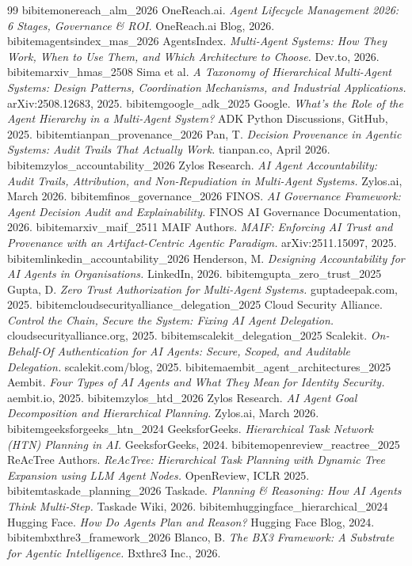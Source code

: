 \begin{thebibliography}{99}
%
%
 bibitem{onereach_alm_2026}
OneReach.ai. \emph{Agent Lifecycle Management 2026: 6 Stages, Governance \& ROI.}
OneReach.ai Blog, 2026.
%
 bibitem{agentsindex_mas_2026}
AgentsIndex. \emph{Multi-Agent Systems: How They Work, When to Use Them, and Which Architecture to Choose.}
Dev.to, 2026.
%
 bibitem{arxiv_hmas_2508}
Sima et al. \emph{A Taxonomy of Hierarchical Multi-Agent Systems: Design Patterns, Coordination Mechanisms, and Industrial Applications.}
arXiv:2508.12683, 2025.
%
 bibitem{google_adk_2025}
Google. \emph{What's the Role of the Agent Hierarchy in a Multi-Agent System?}
ADK Python Discussions, GitHub, 2025.
%
%
 bibitem{tianpan_provenance_2026}
Pan, T. \emph{Decision Provenance in Agentic Systems: Audit Trails That Actually Work.}
tianpan.co, April 2026.
%
 bibitem{zylos_accountability_2026}
Zylos Research. \emph{AI Agent Accountability: Audit Trails, Attribution, and Non-Repudiation in Multi-Agent Systems.}
Zylos.ai, March 2026.
%
 bibitem{finos_governance_2026}
FINOS. \emph{AI Governance Framework: Agent Decision Audit and Explainability.}
FINOS AI Governance Documentation, 2026.
%
 bibitem{arxiv_maif_2511}
MAIF Authors. \emph{MAIF: Enforcing AI Trust and Provenance with an Artifact-Centric Agentic Paradigm.}
arXiv:2511.15097, 2025.
%
 bibitem{linkedin_accountability_2026}
Henderson, M. \emph{Designing Accountability for AI Agents in Organisations.}
LinkedIn, 2026.
%
%
 bibitem{gupta_zero_trust_2025}
Gupta, D. \emph{Zero Trust Authorization for Multi-Agent Systems.}
guptadeepak.com, 2025.
%
 bibitem{cloudsecurityalliance_delegation_2025}
Cloud Security Alliance. \emph{Control the Chain, Secure the System: Fixing AI Agent Delegation.}
cloudsecurityalliance.org, 2025.
%
 bibitem{scalekit_delegation_2025}
Scalekit. \emph{On-Behalf-Of Authentication for AI Agents: Secure, Scoped, and Auditable Delegation.}
scalekit.com/blog, 2025.
%
 bibitem{aembit_agent_architectures_2025}
Aembit. \emph{Four Types of AI Agents and What They Mean for Identity Security.}
aembit.io, 2025.
%
%
 bibitem{zylos_htd_2026}
Zylos Research. \emph{AI Agent Goal Decomposition and Hierarchical Planning.}
Zylos.ai, March 2026.
%
 bibitem{geeksforgeeks_htn_2024}
GeeksforGeeks. \emph{Hierarchical Task Network (HTN) Planning in AI.}
GeeksforGeeks, 2024.
%
 bibitem{openreview_reactree_2025}
ReAcTree Authors. \emph{ReAcTree: Hierarchical Task Planning with Dynamic Tree Expansion using LLM Agent Nodes.}
OpenReview, ICLR 2025.
%
 bibitem{taskade_planning_2026}
Taskade. \emph{Planning \& Reasoning: How AI Agents Think Multi-Step.}
Taskade Wiki, 2026.
%
 bibitem{huggingface_hierarchical_2024}
Hugging Face. \emph{How Do Agents Plan and Reason?}
Hugging Face Blog, 2024.
%
%
 bibitem{bxthre3_framework_2026}
Blanco, B. \emph{The BX3 Framework: A Substrate for Agentic Intelligence.}
Bxthre3 Inc., 2026.
%
\end{thebibliography}